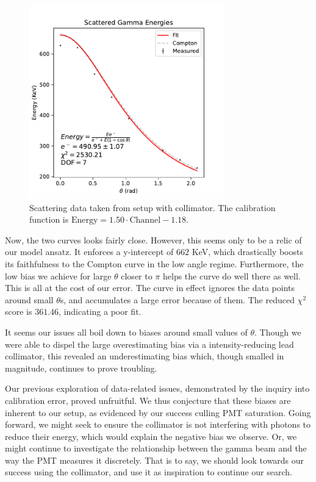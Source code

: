 \documentclass[12pt, letterpaper]{article}
\begin{document}
\begin{figure}[!h]
    \centering
    \includegraphics[width=0.75\textwidth]{experiment2/figures/compton_fit.pdf}
    \caption{Scattering data taken from setup with collimator. The calibration function is $\text{Energy} = 1.50 \cdot \text{Channel}-1.18$. }
    \label{fig:compton-fit}
\end{figure}

Now, the two curves looks fairly close. However, this seems only to be a relic of our model ansatz. It enforces a y-intercept of $662$ KeV, which drastically boosts its faithfulness to the Compton curve in the low angle regime. Furthermore, the low bias we achieve for large $\theta$ closer to $\pi$ helps the curve do well there as well. This is all at the cost of our error. The curve in effect ignores the data points around small $\theta$s, and accumulates a large error because of them. The reduced $\chi^2$ score is $361.46$, indicating a poor fit. 

It seems our issues all boil down to biases around small values of $\theta$. Though we were able to dispel the large overestimating bias via a intensity-reducing lead collimator, this revealed an underestimating bias which, though smalled in magnitude, continues to prove troubling. 

Our previous exploration of data-related issues, demonstrated by the inquiry into calibration error, proved unfruitful. We thus conjecture that these biases are inherent to our setup, as evidenced by our success culling PMT saturation. Going forward, we might seek to ensure the collimator is not interfering with photons to reduce their energy, which would explain the negative bias we observe. Or, we might continue to investigate the relationship between the gamma beam and the way the PMT measures it discretely. That is to say, we should look towards our success using the collimator, and use it as inspiration to continue our search. 
\end{document}

